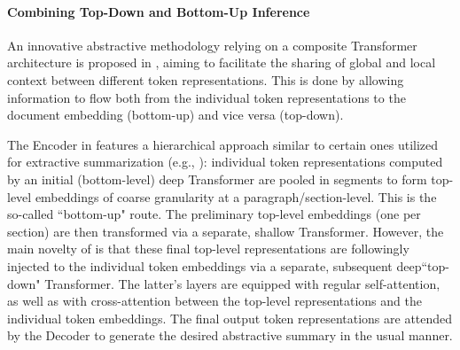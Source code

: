 \documentclass[preprint,review,10pt]{elsarticle}
\begin{document}
	
	
	
	
	\paragraph{Combining Top-Down and Bottom-Up Inference} An innovative abstractive methodology relying on a composite Transformer architecture is proposed in \cite{pan_bottom}, aiming to facilitate the sharing of global and local context between different token representations. This is done by allowing information to flow both from the individual token representations to the document embedding (bottom-up) and vice versa (top-down).
	
	The Encoder in \cite{pan_bottom} features a hierarchical approach similar to certain ones utilized for extractive summarization (e.g., \cite{xiao}): individual token representations computed by an initial (bottom-level) deep Transformer are pooled in segments to form top-level embeddings of coarse granularity at a paragraph/section-level. This is the so-called ``bottom-up" route. The preliminary top-level embeddings (one per section) are then transformed via a separate, shallow Transformer. However, the main novelty of \cite{pan_bottom} is that these final top-level representations are followingly injected to the individual token embeddings via a separate, subsequent deep``top-down" Transformer. The latter's layers are equipped with regular self-attention, as well as with cross-attention between the top-level representations and the individual token embeddings. The final output token representations are attended by the Decoder to generate the desired abstractive summary in the usual manner.
	
\end{document}
